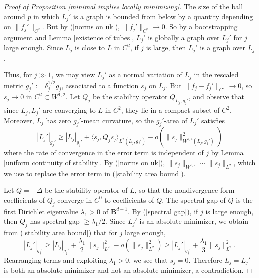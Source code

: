 \documentclass[reqno,11pt]{amsart}
\newcommand{\Ball}{\mathbf{B}}
\theoremstyle{definition}
\numberwithin{equation}{section}
\begin{document}
\begin{proof}[Proof of Proposition \ref{minimal implies locally minimizing}]
The size of the ball around $p$ in which $L_j'$ is a graph is bounded from below by a quantity depending on $\|f_j'\|_{C^2}$.
But by (\ref{norms on uk}), $\|f_j'\|_{C^2} \to 0$.
So by a bootstrapping argument and Lemma \ref{existence of tubes}, $L_j'$ is globally a graph over $L_j'$ for $j$ large enough.
Since $L_j$ is close to $L$ in $C^2$, if $j$ is large, then $L_j'$ is a graph over $L_j$.

Thus, for $j \gg 1$, we may view $L_j'$ as a normal variation of $L_j$ in the rescaled metric $g_j' := \delta_j^{1/2} g_j$, associated to a function $s_j$ on $L_j$.
But $\|f_j - f_j'\|_{C^2} \to 0$, so $s_j \to 0$ in $C^2 \subset W^{1, 2}$.
Let $Q_j$ be the stability operator $Q_{L_j, g_j'}$, and observe that since $L_j, L_j'$ are converging to $L$ in $C^2$, they lie in a compact subset of $C^2$. 
Moreover, $L_j$ has zero $g_j'$-mean curvature, so the $g_j'$-area of $L_j'$ satisfies
\begin{equation}\label{stability area bound}
|L_j'|_{g_j'} \geq |L_j|_{g_j'} + \langle s_j, Q_j s_j\rangle_{L^2(L_j, g_j')} - o(\|s_j\|_{W^{1, 2}(L_j, g_j')}^2)
\end{equation}
where the rate of convergence in the error term is independent of $j$ by Lemma \ref{uniform continuity of stability}.
By (\ref{norms on uk}), $\|s_j\|_{W^{1, 2}} \sim \|s_j\|_{L^2}$, which we use to replace the error term in (\ref{stability area bound}).

Let $Q = -\Delta$ be the stability operator of $L$, so that the nondivergence form coefficients of $Q_j$ converge in $C^0$ to coefficients of $Q$.
The spectral gap of $Q$ is the first Dirichlet eigenvalue $\lambda_1 > 0$ of $\Ball^{d - 1}$.
By (\ref{spectral gap}), if $j$ is large enough, then $Q_j$ has spectral gap $\geq \lambda_1/2$.
Since $L_j'$ is an absolute minimizer, we obtain from (\ref{stability area bound}) that for $j$ large enough,
$$|L_j'|_{g_j'} \geq |L_j|_{g_j'} + \frac{\lambda_1}{2} \|s_j\|_{L^2}^2 - o(\|s_j\|_{L^2}^2) \geq |L_j'|_{g_j'} + \frac{\lambda_1}{3} \|s_j\|_{L^2}^2.$$
Rearranging terms and exploiting $\lambda_1 > 0$, we see that $s_j = 0$.
Therefore $L_j = L_j'$ is both an absolute minimizer and not an absolute minimizer, a contradiction.
\end{proof}

\printbibliography
\end{document}

